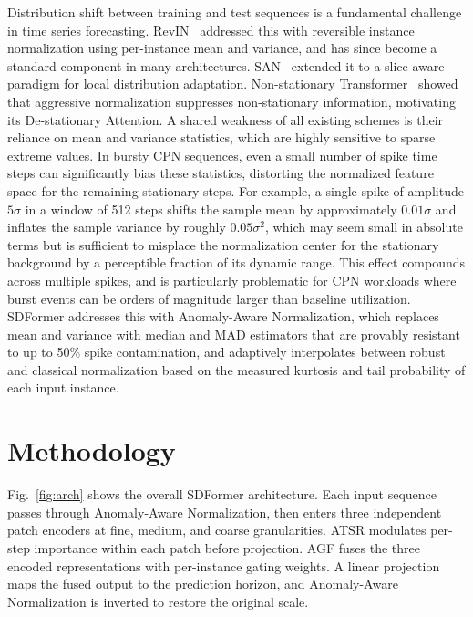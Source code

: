 \documentclass[journal]{IEEEtran}
\begin{document}
Distribution shift between training and test sequences is a fundamental
challenge in time series forecasting.
RevIN~\cite{revin} addressed this with reversible instance normalization
using per-instance mean and variance, and has since become a standard
component in many architectures.
SAN~\cite{san} extended it to a slice-aware paradigm for local distribution
adaptation.
Non-stationary Transformer~\cite{nonstationary} showed that aggressive
normalization suppresses non-stationary information, motivating its
De-stationary Attention.
A shared weakness of all existing schemes is their reliance on mean and
variance statistics, which are highly sensitive to sparse extreme values.
In bursty CPN sequences, even a small number of spike time steps can
significantly bias these statistics, distorting the normalized feature
space for the remaining stationary steps.
For example, a single spike of amplitude $5\sigma$ in a window of 512
steps shifts the sample mean by approximately $0.01\sigma$ and inflates
the sample variance by roughly $0.05\sigma^2$, which may seem small in
absolute terms but is sufficient to misplace the normalization center for
the stationary background by a perceptible fraction of its dynamic range.
This effect compounds across multiple spikes, and is particularly
problematic for CPN workloads where burst events can be orders of
magnitude larger than baseline utilization.
SDFormer addresses this with Anomaly-Aware Normalization, which replaces
mean and variance with median and MAD estimators that are provably
resistant to up to 50\% spike contamination, and adaptively interpolates
between robust and classical normalization based on the measured kurtosis
and tail probability of each input instance.

\section{Methodology}
\label{sec:method}

Fig.~\ref{fig:arch} shows the overall SDFormer architecture.
Each input sequence passes through Anomaly-Aware Normalization, then enters
three independent patch encoders at fine, medium, and coarse granularities.
ATSR modulates per-step importance within each patch before projection.
AGF fuses the three encoded representations with per-instance gating weights.
A linear projection maps the fused output to the prediction horizon, and
Anomaly-Aware Normalization is inverted to restore the original scale.
\end{document}
